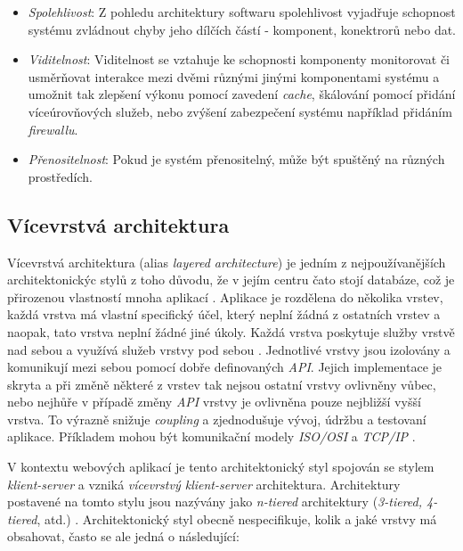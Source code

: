 \begin{itemize}
  \item{\textit{Spolehlivost}}: Z pohledu architektury softwaru spolehlivost vyjadřuje schopnost systému zvládnout chyby jeho dílčích částí - komponent, konektrorů nebo dat.
  \item{\textit{Viditelnost}}: Viditelnost se vztahuje ke schopnosti komponenty monitorovat či usměrňovat interakce mezi dvěmi různými jinými komponentami systému a umožnit tak zlepšení výkonu pomocí zavedení \textit{cache}, škálování pomocí přidání víceúrovňových služeb, nebo zvýšení zabezpečení systému například přidáním \textit{firewallu}.
  \item{\textit{Přenositelnost}}: Pokud je systém přenositelný, může být spuštěný na různých prostředích.
\end{itemize}

\subsection{Vícevrstvá architektura}
\label{sec:n-tier}
Vícevrstvá architektura (alias \textit{layered architecture}) je jedním z nejpoužívanějších architektonickýc stylů z toho důvodu, že v jejím centru čato stojí databáze, což je přirozenou vlastností mnoha aplikací \cite{Richards15}. Aplikace je rozdělena do několika vrstev, každá vrstva má vlastní specifický účel, který neplní žádná z ostatních vrstev a naopak, tato vrstva neplní žádné jiné úkoly. Každá vrstva poskytuje služby vrstvě nad sebou a využívá služeb vrstvy pod sebou \cite{Garlan94}. Jednotlivé vrstvy jsou izolovány a komunikují mezi sebou pomocí dobře definovaných \textit{API}. Jejich implementace je skryta a při změně některé z vrstev tak nejsou ostatní vrstvy ovlivněny vůbec, nebo nejhůře v případě změny \textit{API} vrstvy je ovlivněna pouze nejbližší vyšší vrstva. To výrazně snižuje \textit{coupling} a zjednodušuje vývoj, údržbu a testovaní aplikace. Příkladem mohou být komunikační modely \textit{ISO/OSI} a \textit{TCP/IP} \cite{Zimmerman80}.

V kontextu webových aplikací je tento architektonický styl spojován se stylem \textit{klient-server} a vzniká \textit{vícevrstvý klient-server} architektura. Architektury postavené na tomto stylu jsou nazývány jako \textit{n-tiered} architektury (\textit{3-tiered, 4-tiered}, atd.) \cite{Umar97}. Architektonický styl obecně nespecifikuje, kolik a jaké vrstvy má obsahovat, často se ale jedná o následující:

